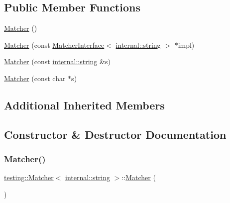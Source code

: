 \subsection*{Public Member Functions}
\begin{DoxyCompactItemize}
\item 
\hyperlink{classtesting_1_1_matcher_3_01internal_1_1string_01_4_ad0c4da71efc8f5b8a07f279fa2bcb392}{Matcher} ()
\item 
\hyperlink{classtesting_1_1_matcher_3_01internal_1_1string_01_4_a03a7b1b4a93b762685e2f46d6255d493}{Matcher} (const \hyperlink{classtesting_1_1_matcher_interface}{Matcher\+Interface}$<$ \hyperlink{namespacetesting_1_1internal_a8e8ff5b11e64078831112677156cb111}{internal\+::string} $>$ $\ast$impl)
\item 
\hyperlink{classtesting_1_1_matcher_3_01internal_1_1string_01_4_ae2d21038e4dcc25776187d8bff1665f3}{Matcher} (const \hyperlink{namespacetesting_1_1internal_a8e8ff5b11e64078831112677156cb111}{internal\+::string} \&s)
\item 
\hyperlink{classtesting_1_1_matcher_3_01internal_1_1string_01_4_a65f1d7616edb049ac059ad5d3fa2d625}{Matcher} (const char $\ast$s)
\end{DoxyCompactItemize}
\subsection*{Additional Inherited Members}


\subsection{Constructor \& Destructor Documentation}
\mbox{\label{classtesting_1_1_matcher_3_01internal_1_1string_01_4_ad0c4da71efc8f5b8a07f279fa2bcb392}} 
\subsubsection{\texorpdfstring{Matcher()}{Matcher()}\hspace{0.1cm}{\footnotesize\ttfamily [1/4]}}
{\footnotesize\ttfamily \hyperlink{classtesting_1_1_matcher}{testing\+::\+Matcher}$<$ \hyperlink{namespacetesting_1_1internal_a8e8ff5b11e64078831112677156cb111}{internal\+::string} $>$\+::\hyperlink{classtesting_1_1_matcher}{Matcher} (\begin{DoxyParamCaption}{ }\end{DoxyParamCaption})\hspace{0.3cm}{\ttfamily [inline]}}


